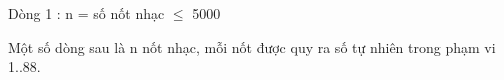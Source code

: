 Dòng 1 : n = số nốt nhạc  $\le$  5000   


   Một số dòng sau là n nốt nhạc, mỗi nốt được quy ra số tự nhiên trong phạm vi 1..88.